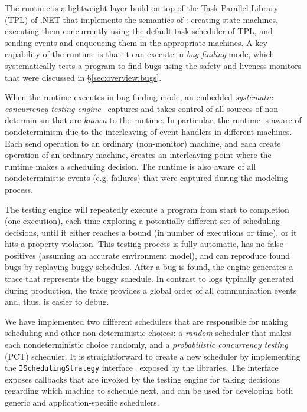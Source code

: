 The \psharp runtime is a lightweight layer build on top of the Task Parallel Library (TPL) of .NET that implements the semantics of \psharp: creating state machines, executing them concurrently using the default task scheduler of TPL, and sending events and enqueueing them in the appropriate machines. A key capability of the \psharp runtime is that it can execute in \emph{bug-finding} mode, which systematically tests a \psharp program to find bugs using the safety and liveness monitors that were discussed in \S\ref{sec:overview:bugs}.

When the \psharp runtime executes in bug-finding mode, an embedded \emph{systematic concurrency testing engine}~\cite{godefroid1997verisoft, musuvathi2008finding, emmi2011delay} captures and takes control of all sources of non-determinism that are \emph{known} to the \psharp runtime. In particular, the runtime is aware of nondeterminism due to the interleaving of event handlers in different machines. Each send operation to an ordinary (non-monitor) machine, and each create operation of an ordinary machine, creates an interleaving point where the runtime makes a scheduling decision. The runtime is also aware of all nondeterministic events (e.g. failures) that were captured during the modeling process.

The \psharp testing engine will repeatedly execute a program from start to completion (one execution), each time exploring a potentially different set of scheduling decisions, until it either reaches a bound (in number of executions or time), or it hits a property violation. This testing process is fully automatic, has no false-positives (assuming an accurate environment model), and can reproduce found bugs by replaying buggy schedules. After a bug is found, the engine generates a trace that represents the buggy schedule. In contrast to logs typically generated during production, the \psharp trace provides a global order of all communication events and, thus, is easier to debug.

We have implemented two different schedulers that are responsible for making scheduling and other non-deterministic choices: a \emph{random} scheduler that makes each nondeterministic choice randomly, and a \emph{probabilistic concurrency testing}~\cite{burckhardt2010pct} (PCT) scheduler. It is straightforward to create a new scheduler by implementing the \texttt{ISchedulingStrategy} interface~\cite{desai2015systematic} exposed by the \psharp libraries. The interface exposes callbacks that are invoked by the \psharp testing engine for taking decisions regarding which machine to schedule next, and can be used for developing both generic and application-specific schedulers.

